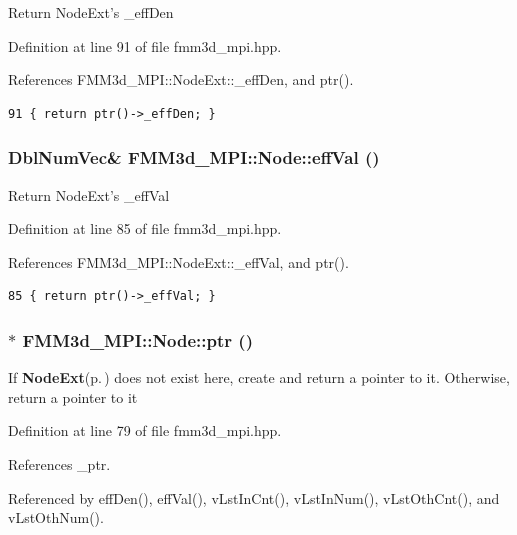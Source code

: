 Return Node\-Ext's \_\-eff\-Den 

Definition at line 91 of file fmm3d\_\-mpi.hpp.

References FMM3d\_\-MPI::Node\-Ext::\_\-eff\-Den, and ptr().

\footnotesize\begin{verbatim}91 { return ptr()->_effDen; }
\end{verbatim}\normalsize 


\subsubsection{\setlength{\rightskip}{0pt plus 5cm}Dbl\-Num\-Vec\& FMM3d\_\-MPI::Node::eff\-Val ()\hspace{0.3cm}{\tt  [inline]}}\label{classFMM3d__MPI_1_1Node_3c1d2a87442a6fcbc47349d5ba993a8a_3c1d2a87442a6fcbc47349d5ba993a8a}


Return Node\-Ext's \_\-eff\-Val 

Definition at line 85 of file fmm3d\_\-mpi.hpp.

References FMM3d\_\-MPI::Node\-Ext::\_\-eff\-Val, and ptr().

\footnotesize\begin{verbatim}85 { return ptr()->_effVal; }
\end{verbatim}\normalsize 


\subsubsection{$\ast$ FMM3d\_\-MPI::Node::ptr ()\hspace{0.3cm}{\tt  [inline]}}\label{classFMM3d__MPI_1_1Node_85549c3ab12fa7f32d2508fc162678d4_85549c3ab12fa7f32d2508fc162678d4}


If {\bf Node\-Ext}{\rm (p.\,\pageref{classFMM3d__MPI_1_1NodeExt})} does not exist here, create and return a pointer to it. Otherwise, return a pointer to it 

Definition at line 79 of file fmm3d\_\-mpi.hpp.

References \_\-ptr.

Referenced by eff\-Den(), eff\-Val(), v\-Lst\-In\-Cnt(), v\-Lst\-In\-Num(), v\-Lst\-Oth\-Cnt(), and v\-Lst\-Oth\-Num().

